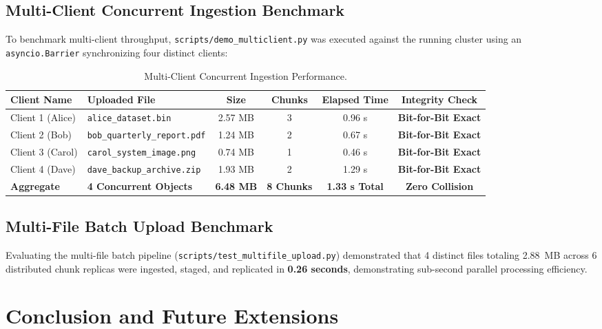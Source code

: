\documentclass[11pt,a4paper]{article}
\begin{document}
\subsection{Multi-Client Concurrent Ingestion Benchmark}
To benchmark multi-client throughput, \texttt{scripts/demo_multiclient.py} was executed against the running cluster using an \texttt{asyncio.Barrier} synchronizing four distinct clients:
\begin{table}[H]
\centering
\small
\begin{tabular}{@{}llcccc@{}}
\toprule
\textbf{Client Name} & \textbf{Uploaded File} & \textbf{Size} & \textbf{Chunks} & \textbf{Elapsed Time} & \textbf{Integrity Check} \\ \midrule
Client 1 (Alice) & \texttt{alice\_dataset.bin}     & 2.57 MB & 3 & 0.96 s & \textbf{Bit-for-Bit Exact} \\
Client 2 (Bob)   & \texttt{bob\_quarterly\_report.pdf} & 1.24 MB & 2 & 0.67 s & \textbf{Bit-for-Bit Exact} \\
Client 3 (Carol) & \texttt{carol\_system\_image.png}   & 0.74 MB & 1 & 0.46 s & \textbf{Bit-for-Bit Exact} \\
Client 4 (Dave)  & \texttt{dave\_backup\_archive.zip}  & 1.93 MB & 2 & 1.29 s & \textbf{Bit-for-Bit Exact} \\ \midrule
\textbf{Aggregate} & \textbf{4 Concurrent Objects}   & \textbf{6.48 MB} & \textbf{8 Chunks} & \textbf{1.33 s Total} & \textbf{Zero Collision} \\ \bottomrule
\end{tabular}
\caption{Multi-Client Concurrent Ingestion Performance.}
\label{tab:multiclient}
\end{table}

\subsection{Multi-File Batch Upload Benchmark}
Evaluating the multi-file batch pipeline (\texttt{scripts/test_multifile_upload.py}) demonstrated that 4 distinct files totaling 2.88~MB across 6 distributed chunk replicas were ingested, staged, and replicated in \textbf{0.26 seconds}, demonstrating sub-second parallel processing efficiency.

\section{Conclusion and Future Extensions}
\label{sec:conclusion}
\end{document}

